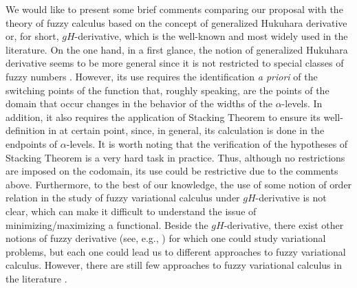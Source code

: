 \documentclass[12pt,a4paper]{article}
\newcommand{\RFA}{\mathbb{R}_{\mathcal{F}(A)}}
\begin{document}
We would like to present some brief comments comparing our proposal with the theory of fuzzy calculus based on the concept of generalized Hukuhara derivative or, for short, $gH$-derivative, which is the well-known and most widely used in the literature. On the one hand, in a first glance, the notion of genera\-lized Hukuhara derivative seems to be more general since it is not restricted to special classes of fuzzy numbers \cite{bede13}. 
However, its use requires the identification {\it a priori} of the switching points of the function that, roughly speaking, are the points of the domain that occur changes in the behavior of the widths of the $\alpha$-levels. In addition, it also requires the application of Stacking Theorem \cite{negoita75} to ensure its well-definition in at certain point, 
since, in general, its calculation is done in the endpoints of $\alpha$-levels. 
It is worth noting that the verification of the hypotheses of Stacking Theorem 
is a very hard task in practice. Thus, although no restrictions are imposed on the codomain, its use could be restrictive due to the comments above. Furthermore, to the best of our knowledge, the use of some notion of order relation in the study of fuzzy variational calculus under $gH$-derivative is not clear, which can make it difficult to understand the issue of minimizing/maximizing a functional. 
Beside the $gH$-derivative, there exist other notions of fuzzy derivative (see, e.g., \cite{khastan2022new})  for which one could study variational problems, but each one could lead us to different approaches to fuzzy variational calculus.  
However, there are still few approaches to fuzzy variational calculus in the literature \cite{verma2022systematic}.

\end{document}
